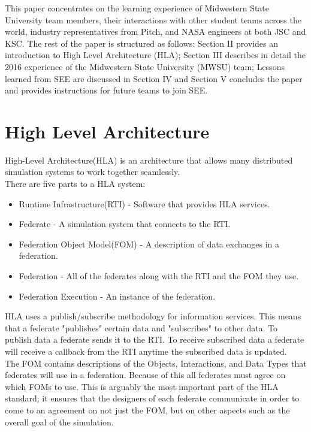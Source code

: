 \documentclass[journal, onecolumn]{IEEEtran}
\begin{document}
This paper concentrates on the learning experience of Midwestern State University team members, their interactions with other student teams across the world, industry representatives from Pitch, and NASA engineers at both JSC and KSC.  The rest of the paper is structured as follows: Section II provides an introduction to High Level Architecture (HLA); Section III describes in detail the 2016 experience of the Midwestern State University (MWSU) team; Lessons learned from SEE are discussed in Section IV and Section V concludes the paper and provides instructions for future teams to join SEE.

\section{High Level Architecture}
High-Level Architecture(HLA) is an architecture that allows many distributed simulation systems to work together seamlessly. \\
		There are five parts to a HLA system:
		\begin{itemize}
			\item Runtime Infrastructure(RTI) - Software that provides HLA services.
			\item Federate - A simulation system that connects to the RTI.
			\item Federation Object Model(FOM) - A description of data exchanges in a federation.
			\item Federation - All of the federates along with the RTI and the FOM they use.
			\item Federation Execution - An instance of the federation.
		\end{itemize}
		HLA uses a publish/subscribe methodology for information services. This means that a federate "publishes" certain data and "subscribes" to other data. To publish data a federate sends it to the RTI. To receive subscribed data a federate will receive a callback from the RTI anytime the subscribed data is updated. \\
		
		The FOM contains descriptions of the Objects, Interactions, and Data Types that federates will use in a federation. Because of this all federates must agree on which FOMs to use. This is arguably the most important part of the HLA standard; it ensures that the designers of each federate communicate in order to come to an agreement on not just the FOM, but on other aspects such as the overall goal of the simulation.
		
\end{document}
